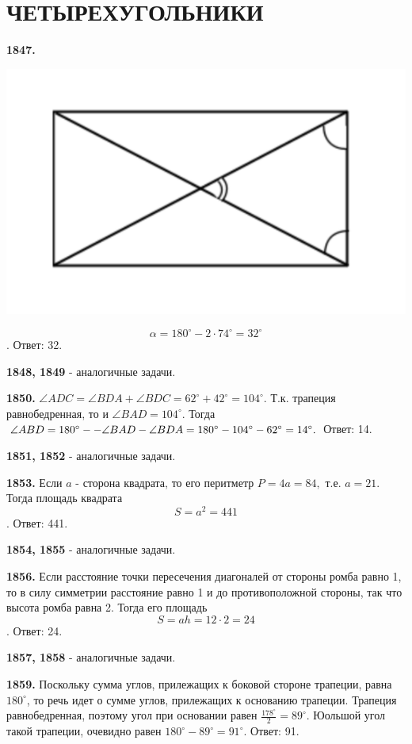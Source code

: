 \section{ЧЕТЫРЕХУГОЛЬНИКИ}

\textbf{1847.}

{\centering \includegraphics[width=0.5\linewidth]{Geometry/Content/19.png}
	
}
\[
\alpha = 180^\circ - 2\cdot 74^\circ = 32^\circ
\]. \null \hspace*{\fill} Ответ: 32.

\textbf{1848, 1849} - аналогичные задачи.

\textbf{1850.} $\angle ADC = \angle BDA + \angle BDC = 62^\circ + 42^\circ = 104^\circ.$ Т.к. трапеция равнобедренная, то и $\angle BAD = 104^\circ$. Тогда $\angle ABD = 180^\circ -\linebreak- \angle BAD - \angle BDA = 180^\circ - 104^\circ - 62^\circ = 14^\circ.$ \newline \null \hspace*{\fill} Ответ: 14.

\textbf{1851, 1852} - аналогичные задачи.

\textbf{1853.} Если $a$ - сторона квадрата, то его перитметр $P = 4a = 84,$ т.е. $a = 21$. Тогда площадь квадрата 
\[
S = a^2 = 441
\].\null \hspace*{\fill} Ответ: 441.

\textbf{1854, 1855} - аналогичные задачи.

\textbf{1856.} Если расстояние точки пересечения диагоналей от стороны ромба равно 1, то в силу симметрии расстояние равно 1 и до противоположной стороны, так что высота ромба равна 2. Тогда его площадь 
\[
S = ah = 12\cdot 2 = 24
\].\null \hspace*{\fill} Ответ: 24.

\textbf{1857, 1858} - аналогичные задачи.

\textbf{1859.} Поскольку сумма углов, прилежащих к боковой стороне трапеции, равна $180^\circ$, то речь идет о сумме углов, прилежащих к основанию трапеции. Трапеция равнобедренная, поэтому угол при основании равен $\frac{178^\circ}{2} = 89^\circ$. Юольшой угол такой трапеции, очевидно равен $180^\circ - 89^\circ = 91^\circ.$ \newline \null \hspace*{\fill} Ответ: 91.

